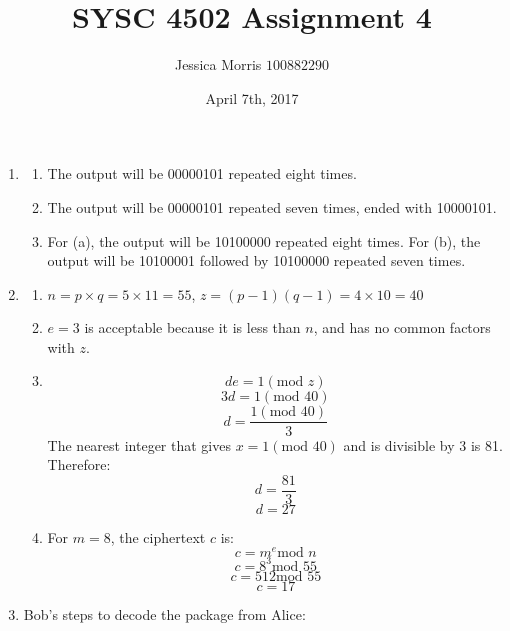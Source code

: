 \documentclass{article}
\title{SYSC 4502 Assignment 4}
\date{April 7th, 2017}
\author{Jessica Morris \(100882290\)}
\begin{document}
\maketitle

\begin{enumerate}

\item
\begin{enumerate}

\item The output will be 00000101 repeated eight times.

\item The output will be 00000101 repeated seven times, ended with 10000101.

\item For (a), the output will be 10100000 repeated eight times. For (b), the output will be 10100001 followed by 
10100000 repeated seven times.

\end{enumerate}

\item
\begin{enumerate}

\item $ n = p \times q = 5 \times 11 = 55 $, $ z = (p-1)(q-1) = 4 \times 10 = 40 $

\item $ e = 3 $ is acceptable because it is less than $n$, and has no common factors with $z$.

\item $$ de = 1(\text{mod } z) $$
$$ 3d = 1(\text{mod } 40) $$
$$ d = \frac{1(\text{mod } 40)}{3} $$
The nearest integer that gives $ x = 1(\text{mod } 40) $ and is divisible by 3 is 81. Therefore:
$$ d = \frac{81}{3} $$
$$ d = 27 $$

\item For $ m = 8 $, the ciphertext $c$ is:
$$ c = m^e \text{mod } n $$
$$ c = 8^3 \text{mod } 55 $$
$$ c = 512 \text{mod } 55 $$
$$ c = 17 $$

\end{enumerate}

\item Bob's steps to decode the package from Alice:

\end{enumerate}
\end{document}
